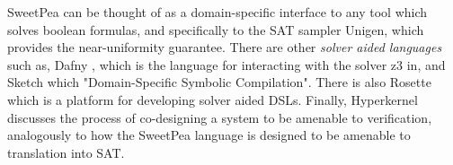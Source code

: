 SweetPea can be thought of as a domain-specific interface to any tool which solves boolean formulas, and specifically to the SAT sampler Unigen, which provides the near-uniformity guarantee. There are other \emph{solver aided languages} such as, Dafny \cite{leino2013developing}, which is the language for interacting with the solver z3 in, and Sketch \cite{bodik2017domain} which "Domain-Specific Symbolic Compilation". There is also Rosette \cite{torlak2014lightweight} which is a platform for developing solver aided DSLs. Finally, Hyperkernel \cite{nelson2017hyperkernel} discusses the process of co-designing a system to be amenable to verification, analogously to how the SweetPea language is designed to be amenable to translation into SAT.
